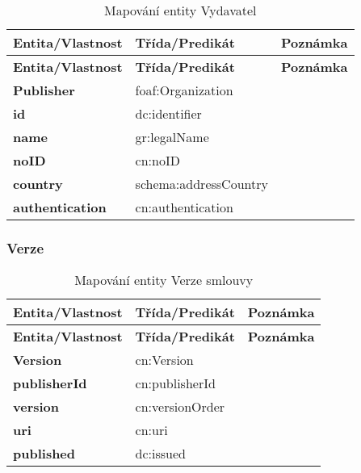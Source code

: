 \begin{center}
\begin{longtable}{lp{30mm}p{65mm}}
\label{grid_mlmmh} \\
\multicolumn{1}{l}{\textbf{Entita/Vlastnost}} & 
\multicolumn{1}{l}{\textbf{Třída/Predikát}} & 
\multicolumn{1}{l}{\textbf{Poznámka}} \\ \hline 
\endfirsthead
\multicolumn{1}{l}{\textbf{Entita/Vlastnost}} & 
\multicolumn{1}{l}{\textbf{Třída/Predikát}} & 
\multicolumn{1}{l}{\textbf{Poznámka}} \\ \hline 
\hline
\endhead
\endfoot
\caption{Mapování entity Vydavatel}
\endlastfoot
\textbf{Publisher} & foaf:Organization & \\
\textbf{id} & dc:identifier \\
\textbf{name} & gr:legalName \\
\textbf{noID} & cn:noID \\
\textbf{country} & schema:addressCountry \\
\textbf{authentication} & cn:authentication \\
\end{longtable}
\end{center}

\subsubsection*{Verze}

\begin{center}
\begin{longtable}{lp{30mm}p{65mm}}
\label{grid_mlmmh} \\
\multicolumn{1}{l}{\textbf{Entita/Vlastnost}} & 
\multicolumn{1}{l}{\textbf{Třída/Predikát}} & 
\multicolumn{1}{l}{\textbf{Poznámka}} \\ \hline 
\endfirsthead
\multicolumn{1}{l}{\textbf{Entita/Vlastnost}} & 
\multicolumn{1}{l}{\textbf{Třída/Predikát}} & 
\multicolumn{1}{l}{\textbf{Poznámka}} \\ \hline 
\hline
\endhead
\endfoot
\caption{Mapování entity Verze smlouvy}
\endlastfoot
\textbf{Version} & cn:Version & \\
\textbf{publisherId} & cn:publisherId & \\
\textbf{version} & cn:versionOrder \\
\textbf{uri} & cn:uri \\
\textbf{published} & dc:issued \\
\end{longtable}
\end{center}

